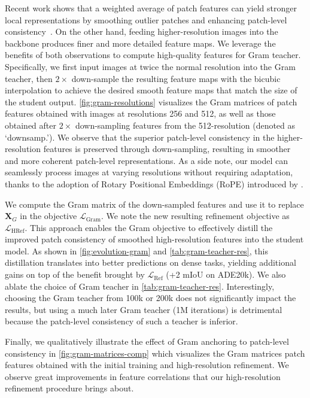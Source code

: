 Recent work shows that a weighted average of patch features can yield stronger local representations by smoothing outlier patches and enhancing patch-level consistency~\citep{wysoczanska2023clipdino}. 
On the other hand, feeding higher-resolution images into the backbone produces finer and more detailed feature maps. 
We leverage the benefits of both observations to compute high-quality features for Gram teacher.
Specifically, we first input images at twice the normal resolution into the Gram teacher, then $2\times$ down-sample the resulting feature maps with the bicubic interpolation to achieve the desired smooth feature maps that match the size of the student output.
\cref{fig:gram-resolutions} visualizes the Gram matrices of patch features obtained with images at resolutions 256 and 512, as well as those obtained after $2\times$ down-sampling features from the 512-resolution (denoted as ‘downsamp.’). We observe that the superior patch-level consistency in the higher-resolution features is preserved through down-sampling, resulting in smoother and more coherent patch-level representations. As a side note, our model can seamlessly process images at varying resolutions without requiring adaptation, thanks to the adoption of Rotary Positional Embeddings (RoPE) introduced by \citet{su2024roformer}.


We compute the Gram matrix of the down-sampled features and use it to replace $\mathbf{X}_{G}$ in the objective $\mathcal{L_{\mathrm{Gram}}}$. We note the new resulting refinement objective as $\mathcal{L}_\mathrm{HRef}$. 
This approach enables the Gram objective to effectively distill the improved patch consistency of smoothed high-resolution features into the student model.
As shown in \cref{fig:evolution-gram} and \cref{tab:gram-teacher-res}, this distillation translates into better predictions on dense tasks, yielding additional gains on top of the benefit brought by $\mathcal{L}_\mathrm{Ref}$ (+2 mIoU on ADE20k).
We also ablate the choice of Gram teacher in \cref{tab:gram-teacher-res}. 
Interestingly, choosing the Gram teacher from 100k or 200k does not significantly impact the results,
but using a much later Gram teacher (1M iterations) is detrimental because the patch-level consistency of such a teacher is inferior. 

Finally, we qualitatively illustrate the effect of Gram anchoring to patch-level consistency in \cref{fig:gram-matrices-comp} which visualizes the Gram matrices patch features obtained with the initial training and high-resolution \gramname refinement.
We observe great improvements in feature correlations that our high-resolution refinement procedure brings about.

